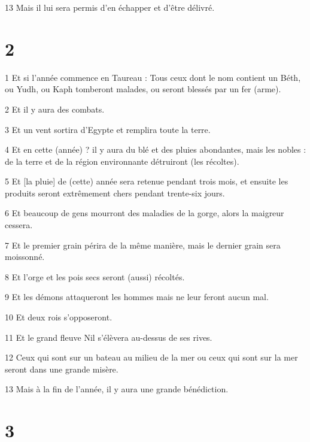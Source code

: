 \par 13 Mais il lui sera permis d'en échapper et d'être délivré.

\chapter{2}

\par 1 Et si l'année commence en Taureau : Tous ceux dont le nom contient un Béth, ou Yudh, ou Kaph tomberont malades, ou seront blessés par un fer (arme).

\par 2 Et il y aura des combats.

\par 3 Et un vent sortira d'Egypte et remplira toute la terre.

\par 4 Et en cette (année) ? il y aura du blé et des pluies abondantes, mais les nobles : de la terre et de la région environnante détruiront (les récoltes).

\par 5 Et [la pluie] de (cette) année sera retenue pendant trois mois, et ensuite les produits seront extrêmement chers pendant trente-six jours.

\par 6 Et beaucoup de gens mourront des maladies de la gorge, alors la maigreur cessera.

\par 7 Et le premier grain périra de la même manière, mais le dernier grain sera moissonné.

\par 8 Et l'orge et les pois secs seront (aussi) récoltés.

\par 9 Et les démons attaqueront les hommes mais ne leur feront aucun mal.

\par 10 Et deux rois s'opposeront.

\par 11 Et le grand fleuve Nil s'élèvera au-dessus de ses rives.

\par 12 Ceux qui sont sur un bateau au milieu de la mer ou ceux qui sont sur la mer seront dans une grande misère.

\par 13 Mais à la fin de l'année, il y aura une grande bénédiction.

\chapter{3}

